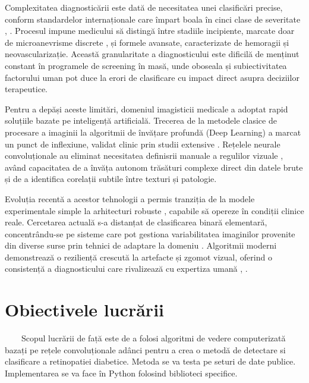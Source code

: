 \documentclass[12pt, a4paper, oneside, romanian]{teza-upb}
\begin{document}
Complexitatea diagnosticării este dată de necesitatea unei clasificări precise, conform
standardelor internaționale care împart boala în cinci clase de severitate \cite{6_wang2021deep}, \cite{11_shakibania2024dual}. Procesul impune
medicului să distingă între stadiile incipiente, marcate doar de microanevrisme discrete \cite{13_staal2004ridge}, și formele
avansate, caracterizate de hemoragii și neovascularizație. Această granularitate a diagnosticului este
dificilă de menținut constant în programele de screening în masă, unde oboseala și subiectivitatea
factorului uman pot duce la erori de clasificare cu impact direct asupra deciziilor terapeutice.
\bigskip

Pentru a depăși aceste limitări, domeniul imagisticii medicale a adoptat rapid soluțiile bazate pe
inteligență artificială. Trecerea de la metodele clasice de procesare a imaginii \cite{2_sopharak2009automatic} la algoritmii de învățare
profundă (Deep Learning) a marcat un punct de inflexiune, validat clinic prin studii extensive \cite{3_gulshan2016development}. Rețelele
neurale convoluționale au eliminat necesitatea definisrii manuale a regulilor vizuale \cite{4_pratt2016convolutional}, având capacitatea
de a învăța autonom trăsături complexe direct din datele brute \cite{9_chetoui2020explainable} și de a identifica corelații subtile între
texturi și patologie.
\bigskip

Evoluția recentă a acestor tehnologii a permis tranziția de la modele experimentale simple la
arhitecturi robuste \cite{7_huang2022rtnet}, capabile să opereze în condiții clinice reale. Cercetarea actuală s-a distanțat de
clasificarea binară elementară, concentrându-se pe sisteme care pot gestiona variabilitatea imaginilor
provenite din diverse surse prin tehnici de adaptare la domeniu \cite{8_zhang2022multi}. Algoritmii moderni demonstrează o
reziliență crescută la artefacte și zgomot vizual, oferind o consistență a diagnosticului care rivalizează cu
expertiza umană \cite{9_chetoui2020explainable}, \cite{10_jabbar2022transfer}.

\section*{Obiectivele lucrării}

\ \ \ \ Scopul lucrării de față este de a folosi algoritmi de vedere computerizată bazați pe rețele convoluționale adânci pentru a crea o metodă de detectare
si clasificare a retinopatiei diabetice. Metoda se va testa pe seturi de date publice. Implementarea se va face în Python folosind biblioteci specifice.
\bigskip
\end{document}
